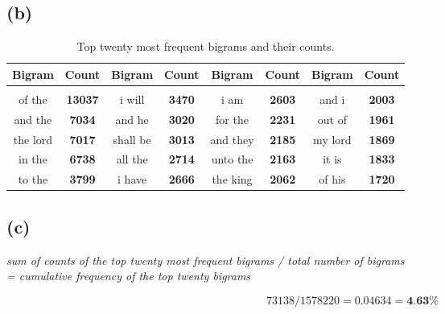 \documentclass{article} %
\begin{document}
\subsection*{(b)}

\begin{table}[!htbp]
\caption{Top twenty most frequent bigrams and their counts.}
\label{table:1}
\begin{center}
\begin{tabular}{c c c c c c c c}
\multicolumn{1}{c}{\bf Bigram} & \multicolumn{1}{c}{\bf Count} & \multicolumn{1}{c}{\bf Bigram} & \multicolumn{1}{c}{\bf Count} &
\multicolumn{1}{c}{\bf Bigram} & \multicolumn{1}{c}{\bf Count} & 
\multicolumn{1}{c}{\bf Bigram} & \multicolumn{1}{c}{\bf Count}
\\ \hline \\
of the & \textbf{13037} & i will & \textbf{3470} & i am & \textbf{2603} & and i & \textbf{2003}\\

and the  & \textbf{7034}  & and he   & \textbf{3020} & for the  & \textbf{2231} & out of   & \textbf{1961}\\

the lord & \textbf{7017}  & shall be & \textbf{3013} & and they & \textbf{2185} & my lord  & \textbf{1869}\\

in the   & \textbf{6738}  & all the  & \textbf{2714} & unto the & \textbf{2163} & it is    & \textbf{1833}\\

to the   & \textbf{3799}  & i have   & \textbf{2666} & the king & \textbf{2062} & of his   & \textbf{1720}\\


\end{tabular}
\end{center}
\end{table}

\subsection*{(c)}

\begin{center}
\textit{sum of counts of the top twenty most frequent bigrams / total number of bigrams\\ = cumulative frequency of the top twenty bigrams}
\end{center}
    
\[  73138 / 1578220 = 0.04634 = \textbf{4.63\%} \]
\end{document}
